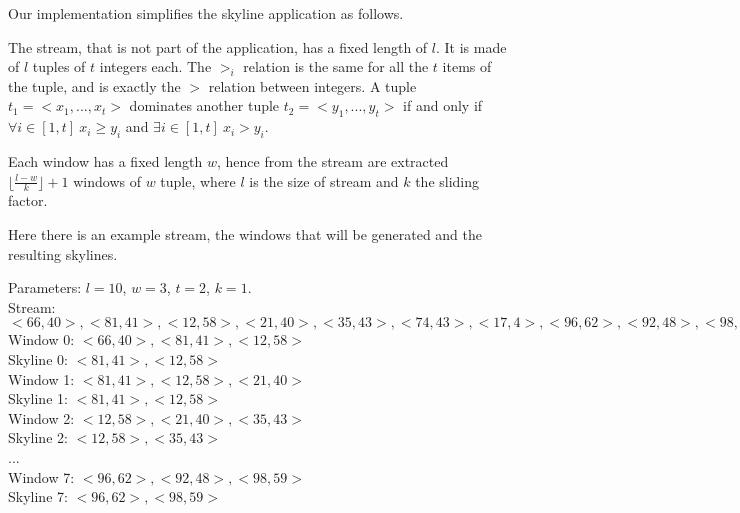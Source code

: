 \bigskip\noindent
Our implementation simplifies the skyline application as follows.

The stream, that is not part of the application, has a fixed length of $l$. It is made of $l$ tuples of $t$ integers each. The $>_i$ relation is the same for all the $t$ items of the tuple, and is exactly the $>$ relation between integers. A tuple $t_1 = <x_1, ... , x_t>$ dominates another tuple $t_2 = <y_1, ... , y_t>$ if and only if $\forall i \in [1, t] \ x_i \geq y_i$ and $\exists i \in [1, t] \ x_i > y_i$.

Each window has a fixed length $w$, hence from the stream are extracted $\lfloor\frac{l-w}{k}\rfloor+1$ windows of $w$ tuple, where $l$ is the size of stream and $k$ the sliding factor.

\bigskip\noindent
Here there is an example stream, the windows that will be generated and the resulting skylines.

\medskip\noindent
Parameters: $l = 10$, $w = 3$, $t = 2$, $k = 1$. \medskip \\
Stream: $<66,40>, <81,41>, <12,58>, <21,40>, <35,43>, <74,43>, <17,4>, <96,62>, <92,48>, <98,59>$ \medskip \\
Window 0: $<66,40>, <81,41>, <12,58>$ \\
Skyline 0: $<81,41>, <12,58>$ \medskip \\
Window 1: $<81,41>, <12,58>, <21,40>$ \\
Skyline 1: $<81,41>, <12,58>$ \medskip \\
Window 2: $<12,58>, <21,40>, <35,43>$ \\
Skyline 2: $<12,58>, <35,43>$ \\
... \smallskip \\
Window 7: $<96,62>, <92,48>, <98,59>$ \\
Skyline 7: $<96,62>, <98,59>$